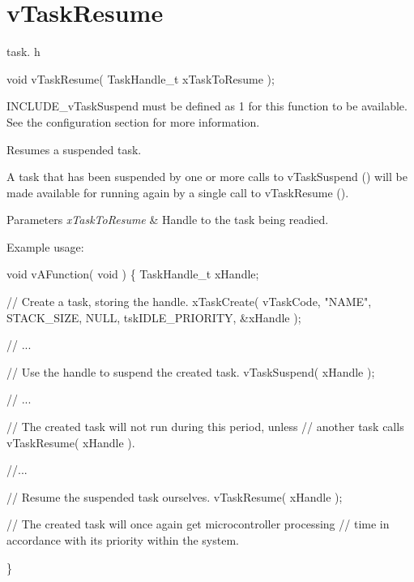 \hypertarget{group__v_task_resume}{}\section{v\+Task\+Resume}
\label{group__v_task_resume}
task. h 
\begin{DoxyPre}void vTaskResume( TaskHandle\_t xTaskToResume );\end{DoxyPre}


I\+N\+C\+L\+U\+D\+E\+\_\+v\+Task\+Suspend must be defined as 1 for this function to be available. See the configuration section for more information.

Resumes a suspended task.

A task that has been suspended by one or more calls to v\+Task\+Suspend () will be made available for running again by a single call to v\+Task\+Resume ().


\begin{DoxyParams}{Parameters}
{\em x\+Task\+To\+Resume} & Handle to the task being readied.\\
\hline
\end{DoxyParams}
Example usage\+: 
\begin{DoxyPre}
void vAFunction( void )
\{
TaskHandle\_t xHandle;
\begin{DoxyVerb}// Create a task, storing the handle.
xTaskCreate( vTaskCode, "NAME", STACK_SIZE, NULL, tskIDLE_PRIORITY, &xHandle );

// ...

// Use the handle to suspend the created task.
vTaskSuspend( xHandle );

// ...

// The created task will not run during this period, unless
// another task calls vTaskResume( xHandle ).

//...


// Resume the suspended task ourselves.
vTaskResume( xHandle );

// The created task will once again get microcontroller processing
// time in accordance with its priority within the system.
\end{DoxyVerb}

\}
  \end{DoxyPre}
 